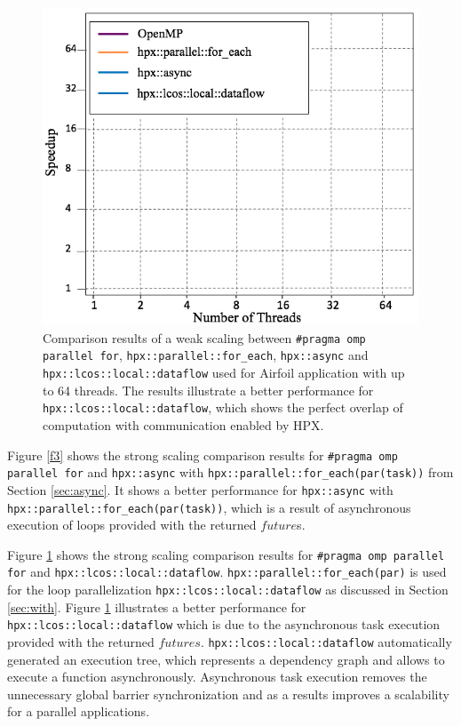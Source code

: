 \documentclass[conference]{IEEEtran}
\begin{document}
\begin{figure} 
\begin{center}
\centering
\includegraphics[width=1\columnwidth]{Pictures/weak.jpg}
\caption {\small{Comparison results of a weak scaling between \texttt{\#pragma omp parallel for}, \texttt{hpx::parallel::for\_each}, \texttt{hpx::async} and \texttt{hpx::lcos::local::dataflow} used for Airfoil application
with up to 64 threads. The results illustrate a better performance for \texttt{hpx::lcos::local::dataflow}, which shows
the perfect overlap of computation with communication enabled by HPX.}}
\label{f2}
\end{center}
\end{figure}



Figure \ref{f3} shows the strong scaling comparison results for \texttt{\#pragma omp parallel for} and \texttt{hpx::async} with \texttt{hpx::parallel::for\_each(par(task))} from Section \ref{sec:async}. It shows a better performance for \texttt{hpx::async} with \texttt{hpx::parallel::for\_each(par(task))}, which is a result of asynchronous execution of loops provided with the returned $future$s.


Figure \ref{f2} shows the strong scaling comparison results for \texttt{\#pragma omp parallel for} and \texttt{hpx::lcos::local::dataflow}. \texttt{hpx::parallel::for\_each(par)} is used for the loop parallelization \texttt{hpx::lcos::local::dataflow} as discussed in Section \ref{sec:with}. Figure \ref{f2} illustrates a better performance for \texttt{hpx::lcos::local::dataflow} which is due to the asynchronous task execution provided with the returned $futures$. \texttt{hpx::lcos::local::dataflow} automatically generated an execution tree, which represents a dependency graph and allows to execute a function asynchronously. Asynchronous task execution removes the unnecessary global barrier synchronization and as a results improves a scalability for a parallel applications.    
\end{document}
